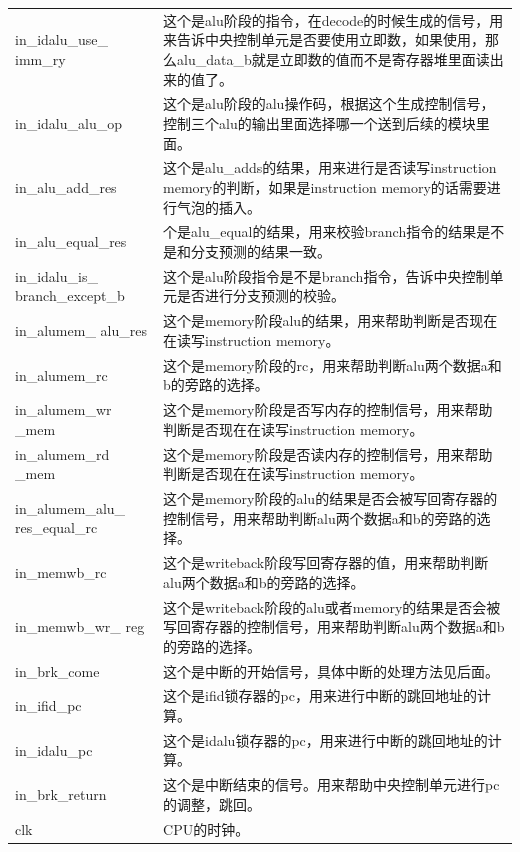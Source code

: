 \begin{center}
\begin{longtable}{p{}p{}}
            in\_idalu\_use\_ imm\_ry & 这个是alu阶段的指令，在decode的时候生成的信号，用来告诉中央控制单元是否要使用立即数，如果使用，那么alu\_data\_b就是立即数的值而不是寄存器堆里面读出来的值了。\\
            in\_idalu\_alu\_op & 这个是alu阶段的alu操作码，根据这个生成控制信号，控制三个alu的输出里面选择哪一个送到后续的模块里面。\\
            in\_alu\_add\_res & 这个是alu\_adds的结果，用来进行是否读写instruction memory的判断，如果是instruction memory的话需要进行气泡的插入。\\
            in\_alu\_equal\_res & 个是alu\_equal的结果，用来校验branch指令的结果是不是和分支预测的结果一致。\\
            in\_idalu\_is\_  branch\_except\_b & 这个是alu阶段指令是不是branch指令，告诉中央控制单元是否进行分支预测的校验。\\
            in\_alumem\_  alu\_res & 这个是memory阶段alu的结果，用来帮助判断是否现在在读写instruction memory。\\
            in\_alumem\_rc & 这个是memory阶段的rc，用来帮助判断alu两个数据a和b的旁路的选择。\\
            in\_alumem\_wr  \_mem & 这个是memory阶段是否写内存的控制信号，用来帮助判断是否现在在读写instruction memory。\\
            in\_alumem\_rd  \_mem & 这个是memory阶段是否读内存的控制信号，用来帮助判断是否现在在读写instruction memory。\\
            in\_alumem\_alu\_  res\_equal\_rc & 这个是memory阶段的alu的结果是否会被写回寄存器的控制信号，用来帮助判断alu两个数据a和b的旁路的选择。\\
            in\_memwb\_rc & 这个是writeback阶段写回寄存器的值，用来帮助判断alu两个数据a和b的旁路的选择。\\
            in\_memwb\_wr\_  reg & 这个是writeback阶段的alu或者memory的结果是否会被写回寄存器的控制信号，用来帮助判断alu两个数据a和b的旁路的选择。\\
            in\_brk\_come & 这个是中断的开始信号，具体中断的处理方法见后面。\\
            in\_ifid\_pc & 这个是ifid锁存器的pc，用来进行中断的跳回地址的计算。\\
            in\_idalu\_pc & 这个是idalu锁存器的pc，用来进行中断的跳回地址的计算。\\
            in\_brk\_return & 这个是中断结束的信号。用来帮助中央控制单元进行pc的调整，跳回。\\
            clk & CPU的时钟。\\

\end{longtable}
\end{center}

